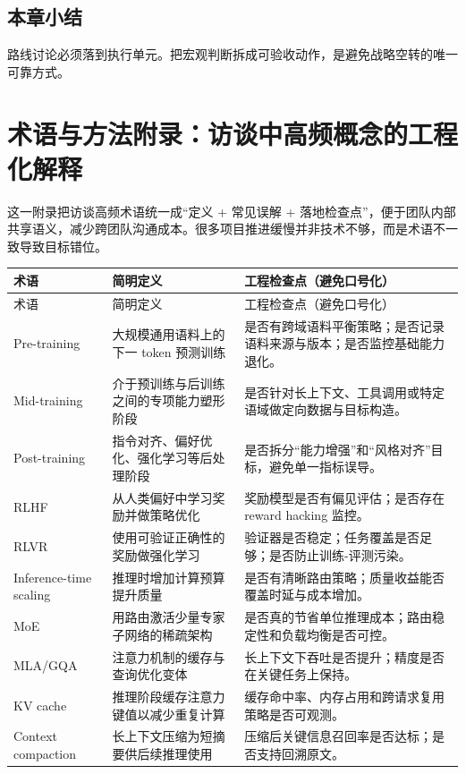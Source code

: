 \documentclass[a4paper]{article}
\begin{document}
\subsection{本章小结}

路线讨论必须落到执行单元。把宏观判断拆成可验收动作，是避免战略空转的唯一可靠方式。

\section{术语与方法附录：访谈中高频概念的工程化解释}

这一附录把访谈高频术语统一成“定义 + 常见误解 + 落地检查点”，便于团队内部共享语义，减少跨团队沟通成本。很多项目推进缓慢并非技术不够，而是术语不一致导致目标错位。

\begin{longtable}{p{}p{}p{}}
\toprule
术语 & 简明定义 & 工程检查点（避免口号化） \\
\midrule
\endfirsthead
\toprule
术语 & 简明定义 & 工程检查点（避免口号化） \\
\midrule
\endhead
Pre-training & 大规模通用语料上的下一 token 预测训练 & 是否有跨域语料平衡策略；是否记录语料来源与版本；是否监控基础能力退化。 \\
Mid-training & 介于预训练与后训练之间的专项能力塑形阶段 & 是否针对长上下文、工具调用或特定语域做定向数据与目标构造。 \\
Post-training & 指令对齐、偏好优化、强化学习等后处理阶段 & 是否拆分“能力增强”和“风格对齐”目标，避免单一指标误导。 \\
RLHF & 从人类偏好中学习奖励并做策略优化 & 奖励模型是否有偏见评估；是否存在 reward hacking 监控。 \\
RLVR & 使用可验证正确性的奖励做强化学习 & 验证器是否稳定；任务覆盖是否足够；是否防止训练-评测污染。 \\
Inference-time scaling & 推理时增加计算预算提升质量 & 是否有清晰路由策略；质量收益能否覆盖时延与成本增加。 \\
MoE & 用路由激活少量专家子网络的稀疏架构 & 是否真的节省单位推理成本；路由稳定性和负载均衡是否可控。 \\
MLA/GQA & 注意力机制的缓存与查询优化变体 & 长上下文下吞吐是否提升；精度是否在关键任务上保持。 \\
KV cache & 推理阶段缓存注意力键值以减少重复计算 & 缓存命中率、内存占用和跨请求复用策略是否可观测。 \\
Context compaction & 长上下文压缩为短摘要供后续推理使用 & 压缩后关键信息召回率是否达标；是否支持回溯原文。 \\

\end{longtable}
\end{document}
